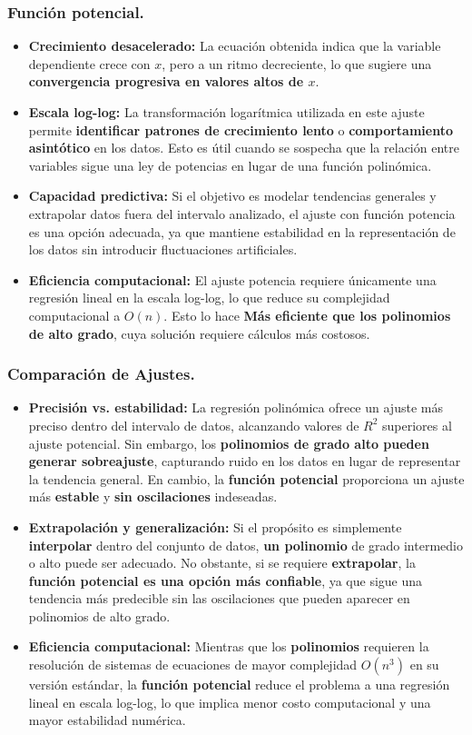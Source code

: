 \documentclass{article}
\begin{document}
\subsubsection*{Función potencial.}
\begin{itemize}
    \item \textbf{Crecimiento desacelerado:} La ecuación obtenida indica que la variable dependiente crece con $x$, pero a un ritmo decreciente, lo que sugiere una \textbf{convergencia progresiva en valores altos de $x$}.
    \item \textbf{Escala log-log:} La transformación logarítmica utilizada en este ajuste permite \textbf{identificar patrones de crecimiento lento} o \textbf{comportamiento asintótico} en los datos. Esto es útil cuando se sospecha que la relación entre variables sigue una ley de potencias en lugar de una función polinómica.
    \item \textbf{Capacidad predictiva:} Si el objetivo es modelar tendencias generales y extrapolar datos fuera del intervalo analizado, el ajuste con función potencia es una opción adecuada, ya que mantiene estabilidad en la representación de los datos sin introducir fluctuaciones artificiales.
    \item \textbf{Eficiencia computacional:} El ajuste potencia requiere únicamente una regresión lineal en la escala log-log, lo que reduce su complejidad computacional a $O(n)$. Esto lo hace \textbf{Más eficiente que los polinomios de alto grado}, cuya solución requiere cálculos más costosos.
\end{itemize}
\subsubsection*{Comparación de Ajustes.}
\begin{itemize}
    \item \textbf{Precisión vs. estabilidad:} La regresión polinómica ofrece un ajuste más preciso dentro del intervalo de datos, alcanzando valores de $R^2$ superiores al ajuste potencial. Sin embargo, los \textbf{polinomios de grado alto pueden generar sobreajuste}, capturando ruido en los datos en lugar de representar la tendencia general. En cambio, la \textbf{función potencial} proporciona un ajuste más \textbf{estable} y \textbf{sin oscilaciones} indeseadas.
    \item \textbf{Extrapolación y generalización:} Si el propósito es simplemente \textbf{interpolar} dentro del conjunto de datos, \textbf{un polinomio} de grado intermedio o alto puede ser adecuado. No obstante, si se requiere \textbf{extrapolar}, la \textbf{función potencial es una opción más confiable}, ya que sigue una tendencia más predecible sin las oscilaciones que pueden aparecer en polinomios de alto grado.
    \item \textbf{Eficiencia computacional:} Mientras que los \textbf{polinomios} requieren la resolución de sistemas de ecuaciones de mayor complejidad $O(n^3)$ en su versión estándar, la \textbf{función potencial} reduce el problema a una regresión lineal en escala log-log, lo que implica menor costo computacional y una mayor estabilidad numérica.
\end{itemize}
\end{document}
